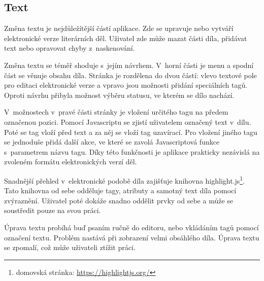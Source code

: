         \subsection{Text}
            Změna textu je nejdůležítější částí aplikace. Zde se upravuje nebo vytváří elektronické verze literárních děl. Uživatel zde může mazat části díla, přidávat text nebo opravovat chyby z~naskenování.
            
            Změna textu se téměř shoduje s~jejím návrhem. V~horní části je menu a spodní část se věnuje obsahu díla. Stránka je rozdělena do dvou částí: vlevo textové pole pro editaci elektronické verze a vpravo jsou možnosti přidání speciálních tagů. Oproti návrhu přibyla možnost výběru statusu, ve kterém se dílo nachází.
            
            V~možnostech v~pravé části stránky je vložení určitého tagu na předem označenou pozici. Pomocí Javascriptu se zjistí uživatelem označený text v~dílu. Poté se tag vloží před text a za něj se vloží tag uzavírací. Pro vložení jiného tagu se jednoduše přidá další akce, ve které se zavolá Javascriptová funkce s~parametrem názvu tagu. Díky této funkčnosti je aplikace prakticky nezávislá na zvoleném formátu elektronických verzí děl.
            
            Snadnější přehled v~elektronické podobě díla zajišťuje knihovna highlight.js\footnote{domovská stránka: \url{https://highlightjs.org/}}. Tato knihovna od sebe odděluje tagy, atributy a samotný text díla pomocí zvýraznění. Uživatel poté dokáže snadno oddělit prvky od sebe a může se soustředit pouze na svou práci.
            
            Úprava textu probíhá buď psaním ručně do editoru, nebo vkládáním tagů pomocí označení textu. Problém nastává při zobrazení velmi obsáhlého díla. Úprava textu se zpomalí, což může uživateli ztížit práci.

